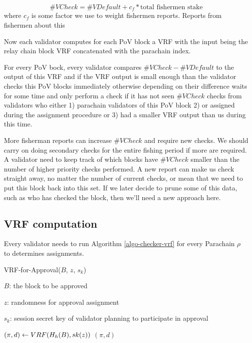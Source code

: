 {$$\#VCheck = \#VDefault + c_f * \textrm{total fishermen stake}$$
where $c_f$ is some factor we use to weight fishermen reports. Reports from fishermen about this 

Now each validator computes for each PoV block a VRF with the input being the relay chain block VRF concatenated with the parachain index. 

For every PoV bock, every validator compares $\#VCheck - \#VDefault$ to the output of this VRF and if the VRF output is small enough than the validator checks this PoV blocks immediately otherwise depending on their difference waits for some time and only perform a check if it has not seen $\#VCheck$ checks from validators who either 1) parachain validators of this PoV block 2) or assigned during the assignment procedure or 3) had a smaller VRF output than us during this time.

More fisherman reports can increase $\#VCheck$ and require new checks. We should carry on doing secondary checks for the entire fishing period if more are required. A validator need to keep track of which blocks have $\#VCheck$ smaller than the number of higher priority checks performed. A new report can make us check straight away, no matter the number of current checks, or mean that we need to put this block back into this set. If we later decide to prune some of this data, such as who has checked the block, then we'll need a new approach here.

\subsection{VRF computation}

Every validator needs to run Algorithm \ref{algo-checker-vrf} for every Parachain $\rho$ to determines assignments.  

\begin{algorithm}
  \caption[VRF-for-Approval]{\sc VRF-for-Approval($B$, $z$, $s_k$)}
  \label{algo-checker-vrf}
  \begin{algorithmic}[1]
  \Require

    $B$: the block to be approved 

    $z$: randomness for approval assignment

    $s_k$: session secret key of validator planning to participate in approval

    \State $(\pi, d) \leftarrow {\sc VRF}(H_h(B),sk(z))$
    \State \Return $(\pi,d)$
  \end{algorithmic}
\end{algorithm}

}

